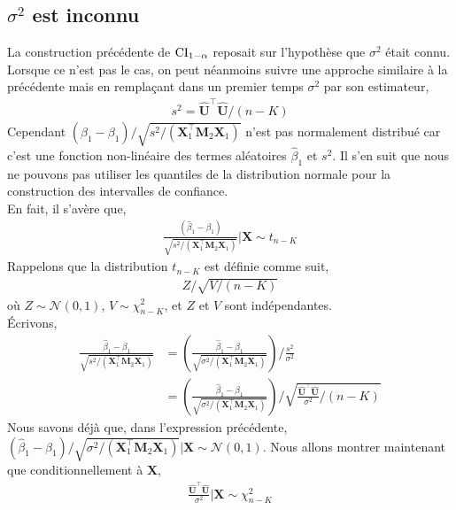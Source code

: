 \subsection{$\sigma^2$ est inconnu}
La construction précédente de $\mathrm{CI}_{1-\alpha}$ reposait sur l'hypothèse que $\sigma^2$ était connu. Lorsque ce n'est pas le cas, on peut néanmoins suivre une approche similaire à la précédente mais en remplaçant dans un premier temps $\sigma^2$ par son estimateur,
\begin{align*}
s^2 = \widehat{\mathbf{U}}^\top \widehat{\mathbf{U}}/(n-K)
\end{align*}
Cependant $(\widehat{\beta}_1-\beta_1)/
\sqrt{s^2/(\mathbf{X}_1^\top\mathbf{M}_2\mathbf{X}_1)}$ n'est pas normalement distribué car c'est une fonction non-linéaire des termes aléatoires $\widehat{\beta}_1$ et $s^2$. Il s'en suit que nous ne pouvons pas utiliser les quantiles de la distribution normale pour la construction des intervalles de confiance.\\
En fait, il s'avère que,
\begin{align}
\frac{(\widehat{\beta}_1-\beta_1)}{\sqrt{s^2/(\mathbf{X}_1^\top\mathbf{M}_2\mathbf{X}_1)}}
| \mathbf{X}
\sim t_{n-K}
\label{eq22}
\end{align}
Rappelons que la	 distribution $t_{n-K}$ est définie comme suit,
\begin{align*}
Z/\sqrt{V/(n-K)}
\end{align*}
où $Z\sim \mathcal{N}(0,1)$, $V\sim \chi^2_{n-K}$, et $Z$ et $V$ sont indépendantes.\\ \'Ecrivons,
\begin{align}
\frac{\widehat{\beta}_1-\beta_1}{\sqrt{s^2/(\mathbf{X}_1^\top\mathbf{M}_2\mathbf{X}_1)}}
&= \left(
\frac{\widehat{\beta}_1-\beta_1}{\sqrt{\sigma^2/(\mathbf{X}_1^\top\mathbf{M}_2\mathbf{X}_1)}}
\right)/
\frac{s^2}{\sigma^2}\nonumber \\
&= 
 \left(
\frac{\widehat{\beta}_1-\beta_1}{\sqrt{\sigma^2/(\mathbf{X}_1^\top\mathbf{M}_2\mathbf{X}_1)}}
\right)/
\sqrt{\frac{\widehat{\mathbf{U}}^\top\widehat{\mathbf{U}}}{\sigma^2}/(n-K)}
\label{eq32}
\end{align}
Nous savons déjà que, dans l'expression précédente, $(\widehat{\beta}_1-\beta_1)/\sqrt{\sigma^2/(\mathbf{X}_1^\top\mathbf{M}_2\mathbf{X}_1)} |\mathbf{X} \sim \mathcal{N}(0,1)$. Nous allons montrer maintenant que conditionnellement à $\mathbf{X}$,
\begin{align}
\frac{\widehat{\mathbf{U}}^\top\widehat{\mathbf{U}}}{\sigma^2} | \mathbf{X}\sim\chi^2_{n-K}
\label{eq23}
\end{align}
